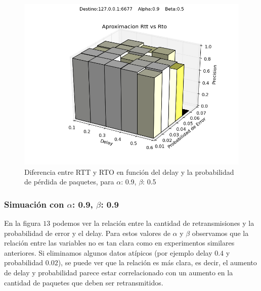 \begin{figure}[H]
  \centering	
	\includegraphics[scale=0.5]{../analisis/graficos_tablas/graficos_en_funcion_de_delay_probaerror/0.9-0.5/rtt_vs_rto.png}
  \caption{Diferencia entre RTT y RTO en funci\'on del delay y la probabilidad de pérdida de paquetes, para $\alpha$: 0.9, $\beta$: 0.5}
	\label{fig:histo-src-sitiotrabajo}
\end{figure}











\subsubsection{Simuación con $\alpha$: 0.9, $\beta$: 0.9}

En la figura $13$ podemos ver la relación entre la cantidad de retransmisiones y la probabilidad de error y el delay. Para estos valores de $\alpha$ y $\beta$ observamos que la relación entre las variables no es tan clara como en experimentos similares anteriores. Si eliminamos algunos datos atípicos (por ejemplo delay $0.4$ y probabilidad $0.02$), se puede ver que la relación es más clara, es decir, el aumento de delay y probabilidad parece estar correlacionado con un aumento en la cantidad de paquetes que deben ser retransmitidos.

